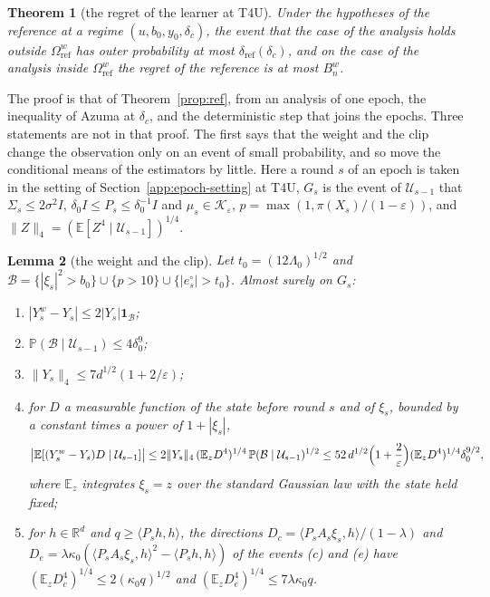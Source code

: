 \documentclass[11pt]{amsart}
\newtheorem{theorem}{Theorem}[section]
\newtheorem{lemma}[theorem]{Lemma}
\theoremstyle{definition}
\numberwithin{equation}{section}
\newcommand{\R}{\mathbb{R}}
\newcommand{\E}{\mathbb{E}}
\newcommand{\Prob}{\mathbb{P}}
\newcommand{\cK}{\mathcal{K}}
\newcommand{\ip}[1]{\langle #1\rangle}
\begin{document}
\begin{theorem}[the regret of the learner at T4U]\label{thm:refw}
Under the hypotheses of the reference at a regime $(u,b_0,y_0,\delta_c)$, the event that the case of the analysis holds outside $\Omega^w_{\mathrm{ref}}$ has outer probability at most $\delta_{\mathrm{ref}}(\delta_c)$, and on the case of the analysis inside $\Omega^w_{\mathrm{ref}}$ the regret of the reference is at most $B^w_n$.
\end{theorem}

The proof is that of Theorem~\ref{prop:ref}, from an analysis of one epoch, the inequality of Azuma at $\delta_c$, and the deterministic step that joins the epochs. Three statements are not in that proof. The first says that the weight and the clip change the observation only on an event of small probability, and so move the conditional means of the estimators by little. Here a round $s$ of an epoch is taken in the setting of Section~\ref{app:epoch-setting} at T4U, $G_s$ is the event of $\mathcal U_{s-1}$ that $\Sigma_s\le2\sigma^2I$, $\delta_0I\le P_s\le\delta_0^{-1}I$ and $\mu_s\in\cK_\varepsilon$, $p=\max(1,\pi(X_s)/(1-\varepsilon))$, and $\|Z\|_4=(\E[Z^4\mid\mathcal U_{s-1}])^{1/4}$.

\begin{lemma}[the weight and the clip]\label{lem:skw}
Let $t_0=(12\Lambda_0)^{1/2}$ and $\mathcal B=\{|\xi_s|^2>b_0\}\cup\{p>10\}\cup\{|e^\circ_s|>t_0\}$. Almost surely on $G_s$:
\begin{enumerate}[label=(\roman*)]
\item $|Y^w_s-Y_s|\le2|Y_s|\mathbf 1_{\mathcal B}$;
\item $\Prob(\mathcal B\mid\mathcal U_{s-1})\le4\delta_0^9$;
\item $\|Y_s\|_4\le7d^{1/2}(1+2/\varepsilon)$;
\item for $D$ a measurable function of the state before round $s$ and of $\xi_s$, bounded by a constant times a power of $1+|\xi_s|$,
\[
\bigl|\E[(Y^w_s-Y_s)D\mid\mathcal U_{s-1}]\bigr|\le2\|Y_s\|_4\,(\E_zD^4)^{1/4}\,\Prob(\mathcal B\mid\mathcal U_{s-1})^{1/2}\le52\,d^{1/2}\Bigl(1+\frac2\varepsilon\Bigr)(\E_zD^4)^{1/4}\delta_0^{9/2},
\]
where $\E_z$ integrates $\xi_s=z$ over the standard Gaussian law with the state held fixed;
\item for $h\in\R^d$ and $q\ge\ip{P_sh,h}$, the directions $D_c=\ip{P_sA_s\xi_s,h}/(1-\lambda)$ and $D_e=\lambda\kappa_0(\ip{P_sA_s\xi_s,h}^2-\ip{P_sh,h})$ of the events (c) and (e) have $(\E_zD_c^4)^{1/4}\le2(\kappa_0q)^{1/2}$ and $(\E_zD_e^4)^{1/4}\le7\lambda\kappa_0q$.
\end{enumerate}
\end{lemma}
\end{document}
